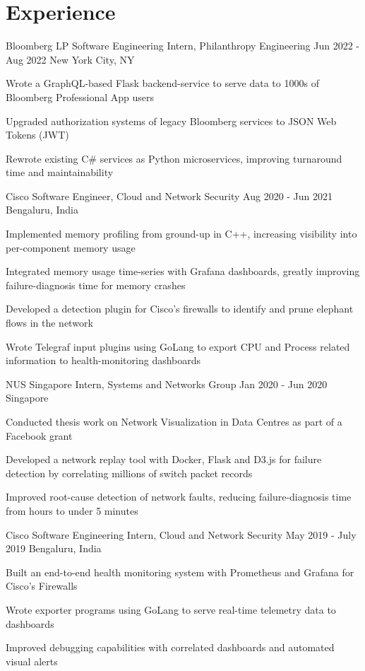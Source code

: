 \section{Experience}
\resumeSubHeadingListStart

\resumeExp
{Bloomberg LP}
{Software Engineering Intern, Philanthropy Engineering}
{Jun 2022 - Aug 2022}
{New York City, NY}

\resumeItemListStart
\item[$\bullet$] Wrote a GraphQL-based Flask backend-service to serve data to 1000s of Bloomberg Professional App users
\item[$\bullet$] Upgraded authorization systems of legacy Bloomberg services to JSON Web Tokens (JWT)
\item[$\bullet$] Rewrote existing C\# services as Python microservices, improving turnaround time and maintainability
\resumeItemListEnd


\resumeExp
{Cisco}
{Software Engineer, Cloud and Network Security}
{Aug 2020 - Jun 2021}
{Bengaluru, India}

\resumeItemListStart
\item[$\bullet$] Implemented memory profiling from ground-up in C++, increasing visibility into per-component memory usage
        \item[$\bullet$] Integrated memory usage time-series with Grafana dashboards, greatly improving failure-diagnosis time for memory crashes
        \item[$\bullet$] Developed a detection plugin for Cisco's firewalls to identify and prune elephant flows in the network
        \item[$\bullet$] Wrote Telegraf input plugins using GoLang to export CPU and Process related information to health-monitoring dashboards
\resumeItemListEnd

\resumeExp
{NUS Singapore}
{Intern, Systems and Networks Group}
{Jan 2020 - Jun 2020}
{Singapore}

\resumeItemListStart
\item[$\bullet$] {Conducted thesis work on Network Visualization in Data Centres as part of a Facebook grant}
	    \item[$\bullet$] {Developed a network replay tool with Docker, Flask and D3.js for failure detection by correlating millions of switch packet records}
	    \item[$\bullet$] {Improved root-cause detection of network faults, reducing failure-diagnosis time from hours to under 5 minutes} 
\resumeItemListEnd

\resumeExp
{Cisco}
{Software Engineering Intern, Cloud and Network Security}
{May 2019 - July 2019}
{Bengaluru, India}

\resumeItemListStart
\item[$\bullet$]{Built an end-to-end health monitoring system with Prometheus and Grafana for Cisco's Firewalls}
	\item[$\bullet$]{Wrote exporter programs using GoLang to serve real-time telemetry data to dashboards}
	\item[$\bullet$]{Improved debugging capabilities with correlated dashboards and automated visual alerts}
\resumeItemListEnd

\resumeSubHeadingListEnd
\vspace{-5.5mm}